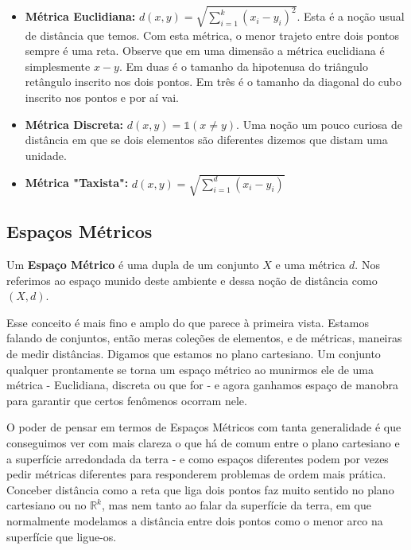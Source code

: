 \begin{itemize}
    \item \textbf{Métrica Euclidiana:} $d(x,y) = \sqrt{\sum_{i=1}^k (x_i - y_i)^2}$. Esta é a noção usual de distância que temos. Com esta métrica, o menor trajeto entre dois pontos sempre é uma reta. Observe que em uma dimensão a métrica euclidiana é simplesmente $x-y$. Em duas é o tamanho da hipotenusa do triângulo retângulo inscrito nos dois pontos. Em três é o tamanho da diagonal do cubo inscrito nos pontos e por aí vai.
    \item \textbf{Métrica Discreta:} $d(x,y) = \mathbb{1}(x \neq y)$. Uma noção um pouco curiosa de distância em que se dois elementos são diferentes dizemos que distam uma unidade. 
    \item \textbf{Métrica "Taxista":} $d(x,y) = \sqrt{\sum_{i=1}^d (x_i - y_i)}$
\end{itemize}



\subsection{Espaços Métricos}

\begin{defi}
Um \textbf{Espaço Métrico} é uma dupla de um conjunto $X$ e uma métrica $d$. Nos referimos ao espaço munido deste ambiente e dessa noção de distância como $(X,d)$.
\end{defi}

Esse conceito é mais fino e amplo do que parece à primeira vista. Estamos falando de conjuntos, então meras coleções de elementos, e de métricas, maneiras de medir distâncias. Digamos que estamos no plano cartesiano. Um conjunto qualquer prontamente se torna um espaço métrico ao munirmos ele de uma métrica - Euclidiana, discreta ou que for - e agora ganhamos espaço de manobra para garantir que certos fenômenos ocorram nele.

O poder de pensar em termos de Espaços Métricos com tanta generalidade é que conseguimos ver com mais clareza o que há de comum entre o plano cartesiano e a superfície arredondada da terra - e como espaços diferentes podem por vezes pedir métricas diferentes para responderem problemas de ordem mais prática. Conceber distância como a reta que liga dois pontos faz muito sentido no plano cartesiano ou no $\mathbb{R}^k$, mas nem tanto ao falar da superfície da terra, em que normalmente modelamos a distância entre dois pontos como o menor arco na superfície que ligue-os. 




